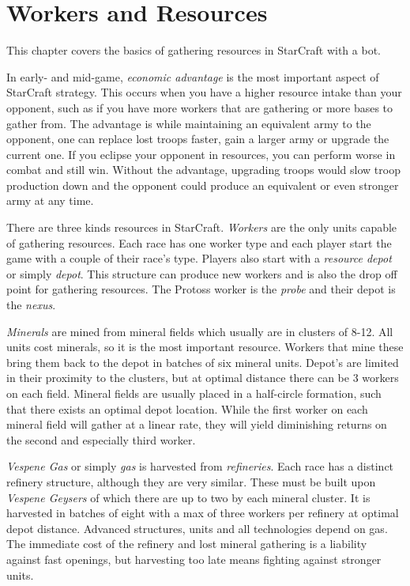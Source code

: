 \chapter{Workers and Resources}
This chapter covers the basics of gathering resources in StarCraft with a bot. 

In early- and mid-game, \emph{economic advantage} is the most important aspect of StarCraft strategy. This occurs when you have a higher resource intake than your opponent, such as if you have more workers that are gathering or more bases to gather from. The advantage is while maintaining an equivalent army to the opponent, one can replace lost troops faster, gain a larger army or upgrade the current one. If you eclipse your opponent in resources, you can perform worse in combat and still win. Without the advantage, upgrading troops would slow troop production down and the opponent could produce an equivalent or even stronger army at any time.

There are three kinds resources in StarCraft. \emph{Workers} are the only units capable of gathering resources. Each race has one worker type and each player start the game with a couple of their race's type. Players also start with a \emph{resource depot} or simply \emph{depot}. This structure can produce new workers and is also the drop off point for gathering resources. The Protoss worker is the \emph{probe} and their depot is the \emph{nexus}.

\emph{Minerals} are mined from mineral fields which usually are in clusters of 8-12. All units cost minerals, so it is the most important resource. Workers that mine these bring them back to the depot in batches of six mineral units. Depot's are limited in their proximity to the clusters, but at optimal distance there can be 3 workers on each field. Mineral fields are usually placed in a half-circle formation, such that there exists an optimal depot location. While the first worker on each mineral field will gather at a linear rate, they will yield diminishing returns on the second and especially third worker.

\emph{Vespene Gas} or simply \emph{gas} is harvested from \emph{refineries}. Each race has a distinct refinery structure, although they are very similar. These must be built upon \emph{Vespene Geysers} of which there are up to two by each mineral cluster. It is harvested in batches of eight with a max of three workers per refinery at optimal depot distance. Advanced structures, units and all technologies depend on gas. The immediate cost of the refinery and lost mineral gathering is a liability against fast openings, but harvesting too late means fighting against stronger units.

